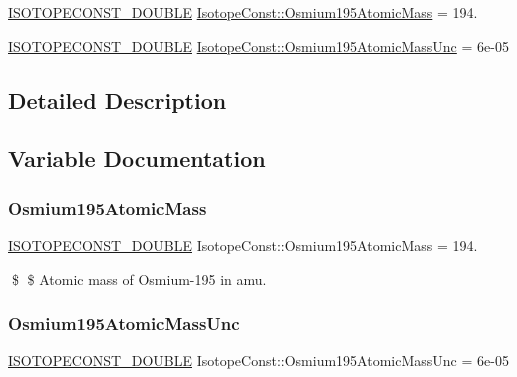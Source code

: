 \begin{DoxyCompactItemize}
\item 
\mbox{\hyperlink{group___isotope_const-_macros_ga8f45a7272ce02c0b4c65c44636ed719a}{I\+S\+O\+T\+O\+P\+E\+C\+O\+N\+S\+T\+\_\+\+D\+O\+U\+B\+LE}} \mbox{\hyperlink{group___isotope_const-_osmium-_os195_gaaa75e83bdd4e4939d3971e323f3a4410}{Isotope\+Const\+::\+Osmium195\+Atomic\+Mass}} = 194.
\item 
\mbox{\hyperlink{group___isotope_const-_macros_ga8f45a7272ce02c0b4c65c44636ed719a}{I\+S\+O\+T\+O\+P\+E\+C\+O\+N\+S\+T\+\_\+\+D\+O\+U\+B\+LE}} \mbox{\hyperlink{group___isotope_const-_osmium-_os195_ga6262ec585bbd51f3fd50814d8d0ef80a}{Isotope\+Const\+::\+Osmium195\+Atomic\+Mass\+Unc}} = 6e-\/05
\end{DoxyCompactItemize}


\subsection{Detailed Description}


\subsection{Variable Documentation}
\mbox{\label{group___isotope_const-_osmium-_os195_gaaa75e83bdd4e4939d3971e323f3a4410}} 
\subsubsection{\texorpdfstring{Osmium195\+Atomic\+Mass}{Osmium195AtomicMass}}
{\footnotesize\ttfamily \mbox{\hyperlink{group___isotope_const-_macros_ga8f45a7272ce02c0b4c65c44636ed719a}{I\+S\+O\+T\+O\+P\+E\+C\+O\+N\+S\+T\+\_\+\+D\+O\+U\+B\+LE}} Isotope\+Const\+::\+Osmium195\+Atomic\+Mass = 194.}

\$ \$ Atomic mass of Osmium-\/195 in amu. \mbox{\label{group___isotope_const-_osmium-_os195_ga6262ec585bbd51f3fd50814d8d0ef80a}} 
\subsubsection{\texorpdfstring{Osmium195\+Atomic\+Mass\+Unc}{Osmium195AtomicMassUnc}}
{\footnotesize\ttfamily \mbox{\hyperlink{group___isotope_const-_macros_ga8f45a7272ce02c0b4c65c44636ed719a}{I\+S\+O\+T\+O\+P\+E\+C\+O\+N\+S\+T\+\_\+\+D\+O\+U\+B\+LE}} Isotope\+Const\+::\+Osmium195\+Atomic\+Mass\+Unc = 6e-\/05}

